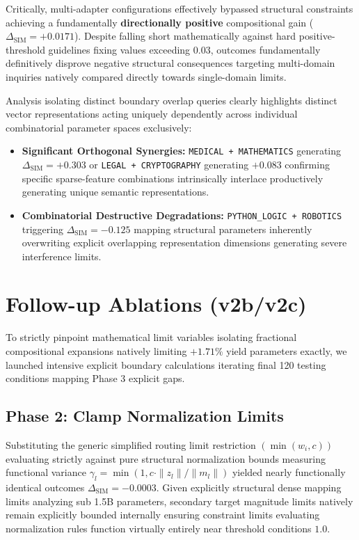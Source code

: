 \documentclass[11pt]{article}
\begin{document}
Critically, multi-adapter configurations effectively bypassed structural constraints achieving a fundamentally \textbf{directionally positive} compositional gain ($\Delta_{\text{SIM}} = +0.0171$). Despite falling short mathematically against hard positive-threshold guidelines fixing values exceeding $0.03$, outcomes fundamentally definitively disprove negative structural consequences targeting multi-domain inquiries natively compared directly towards single-domain limits. 

Analysis isolating distinct boundary overlap queries clearly highlights distinct vector representations acting uniquely dependently across individual combinatorial parameter spaces exclusively:
\begin{itemize}
    \item \textbf{Significant Orthogonal Synergies:} \texttt{MEDICAL + MATHEMATICS} generating $\Delta_{\text{SIM}} = +0.303$ or \texttt{LEGAL + CRYPTOGRAPHY} generating $+0.083$ confirming specific sparse-feature combinations intrinsically interlace productively generating unique semantic representations.
    \item \textbf{Combinatorial Destructive Degradations:} \texttt{PYTHON\_LOGIC + ROBOTICS} triggering $\Delta_{\text{SIM}} = -0.125$ mapping structural parameters inherently overwriting explicit overlapping representation dimensions generating severe interference limits.
\end{itemize}

\section{Follow-up Ablations (v2b/v2c)}

To strictly pinpoint mathematical limit variables isolating fractional compositional expansions natively limiting $+1.71\%$ yield parameters exactly, we launched intensive explicit boundary calculations iterating final 120 testing conditions mapping Phase 3 explicit gaps.

\subsection{Phase 2: Clamp Normalization Limits}
Substituting the generic simplified routing limit restriction $(\min(w_i, c))$ evaluating strictly against pure structural normalization bounds measuring functional variance $\gamma_l = \min(1, c \cdot \|z_l\| / \|m_l\|)$ yielded nearly functionally identical outcomes $\Delta_{\text{SIM}} = -0.0003$. Given explicitly structural dense mapping limits analyzing sub 1.5B parameters, secondary target magnitude limits natively remain explicitly bounded internally ensuring constraint limits evaluating normalization rules function virtually entirely near threshold conditions $1.0$.
\end{document}
